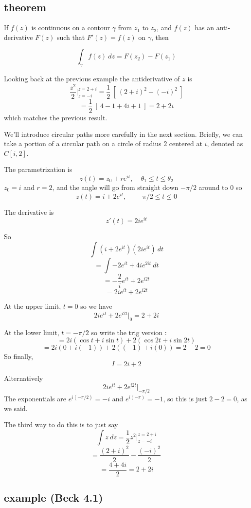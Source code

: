 \documentclass[11pt, oneside]{article}
\begin{document}
\subsection*{theorem}

If $f(z)$ is continuous on a contour $\gamma$ from $z_1$ to $z_2$, and $f(z)$ has an anti-derivative $F(z)$ such that $F'(z) = f(z)$ on $\gamma$, then

\[ \int_\gamma f(z) \ dz = F(z_2) - F(z_1) \]

Looking back at the previous example the antiderivative of $z$ is
\[ \frac{z^2}{2} \bigg |_{z = -i}^{z = 2 + i} = \frac{1}{2} \ [ \ (2 + i)^2 - (-i)^2 \ ]\]
\[ = \frac{1}{2} \ [ \ 4 - 1 + 4i + 1 \ ] = 2 + 2i \]
which matches the previous result.

We'll introduce circular paths more carefully in the next section.  Briefly, we can take a portion of a circular path on a circle of radius $2$ centered at $i$, denoted as $C[i,2]$.

The parametrization is
\[ z(t) = z_0 + re^{it}, \ \ \ \ \ \theta_1 \le t \le \theta_2 \]
$z_0 = i$ and $r = 2$, and the angle will go from straight down $- \pi/2$ around to $0$ so
\[ z(t) = i + 2e^{it}, \ \ \ \ \ - \pi/2 \le t \le 0 \]

The derivative is
\[ z'(t) = 2ie^{it} \]

So
\[ \int (i + 2e^{it})(2i e^{it}) \ dt \]
\[ = \int -2 e^{it} + 4i e^{2it} \ dt \]
\[ = - \frac{2}{i} e^{it} + 2 e^{i2t} \]
\[ = 2 ie^{it} + 2 e^{i2t} \]

At the upper limit, $t = 0$ so we have 
\[  2 ie^{it} + 2 e^{i2t} \bigg |_0 = 2 + 2i \]

At the lower limit, $t = - \pi/2$ so write the trig version :
\[ = 2i(\cos t + i \sin t) + 2(\cos 2t + i \sin 2t)   \]
\[ = 2i(0 + i(-1)) + 2((-1) + i(0)) = 2 - 2 = 0 \]
So finally,
\[ I = 2i + 2 \]

Alternatively
\[  2 ie^{it} + 2 e^{i2t} \bigg |_{-\pi/2} \]
The exponentials are $e^{i(-\pi/2)} = -i$ and $e^{i(-\pi)} = -1$, so this is just $2 - 2 = 0$, as we said.

The third way to do this is to just say
\[ \int z \ dz = \frac{1}{2} z^2 \bigg |_{z = -i}^{z = 2 + i} \]
\[ = \frac{(2 + i)^2}{2} - \frac{(-i)^2}{2} \ \]
\[ = \frac{4 + 4i}{2} = 2 + 2i \]

\subsection*{example (Beck 4.1)}
\end{document}
